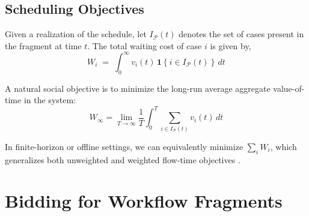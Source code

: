 \documentclass[letterpaper]{article}
\begin{document}
\subsection{Scheduling Objectives}
Given a realization of the schedule, let $I_\mathcal{P}(t)$ denotes the set of cases present in the fragment at time $t$. The total waiting
cost of case $i$ is given by,
\begin{equation}
\label{eq:case_welfare}
W_i \;=\; \int_0^\infty v_i(t)\,\mathbf{1}\!\left\{ i \in I_{\mathcal{P}}(t) \right\}\, dt
\end{equation}


A natural social objective is to minimize the long-run average
aggregate value-of-time in the system:
\begin{equation}
\label{eq:infinte_welfare}
W_\infty = \lim_{T \to \infty} \frac{1}{T} \int_0^T
\sum_{i \in I_\mathcal{P}(t)} v_i(t)\, dt
\end{equation}

In finite-horizon or offline settings, we can equivalently minimize
$\sum_i W_i$, which generalizes both unweighted and weighted flow-time
objectives \citep{schrage1968sequencing}.


\section{Bidding for Workflow Fragments}
\label{sec:model}


\end{document}
